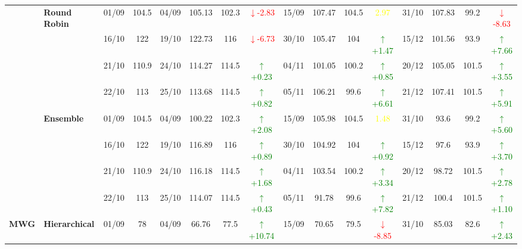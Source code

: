 \documentclass{ieeeaccess}
\begin{document}
{\begin{longtable}{llcc|cccc|cccc|cccc}
& \textbf{Round Robin}
& 01/09 & 104.5 & 04/09 & 105.13 & 102.3 & \textcolor{red}{\(\downarrow\)-2.83} & 15/09 & 107.47 & 104.5 & \textcolor{yellow}{2.97} & 31/10 & 107.83 & 99.2 & \textcolor{red}{\(\downarrow\)-8.63} \\

&
& 16/10 & 122 & 19/10 & 122.73 & 116 & \textcolor{red}{\(\downarrow\)-6.73} & 30/10 & 105.47 & 104 & \textcolor{green}{\(\uparrow\)+1.47} & 15/12 & 101.56 & 93.9 & \textcolor{green}{\(\uparrow\)+7.66} \\

&
& 21/10 & 110.9 & 24/10 & 114.27 & 114.5 & \textcolor{green}{\(\uparrow\)+0.23} & 04/11 & 101.05 & 100.2 & \textcolor{green}{\(\uparrow\)+0.85} & 20/12 & 105.05 & 101.5 & \textcolor{green}{\(\uparrow\)+3.55} \\

&
& 22/10 & 113 & 25/10 & 113.68 & 114.5 & \textcolor{green}{\(\uparrow\)+0.82} & 05/11 & 106.21 & 99.6 & \textcolor{green}{\(\uparrow\)+6.61} & 21/12 & 107.41 & 101.5 & \textcolor{green}{\(\uparrow\)+5.91} \\
\cmidrule(lr){2-16}


& \textbf{Ensemble}
& 01/09 & 104.5 & 04/09 & 100.22 & 102.3 & \textcolor{green}{\(\uparrow\)+2.08} & 15/09 & 105.98 & 104.5 & \textcolor{yellow}{1.48} & 31/10 & 93.6 & 99.2 & \textcolor{green}{\(\uparrow\)+5.60} \\

&
& 16/10 & 122 & 19/10 & 116.89 & 116 & \textcolor{green}{\(\uparrow\)+0.89} & 30/10 & 104.92 & 104 & \textcolor{green}{\(\uparrow\)+0.92} & 15/12 & 97.6 & 93.9 & \textcolor{green}{\(\uparrow\)+3.70} \\

&
& 21/10 & 110.9 & 24/10 & 116.18 & 114.5 & \textcolor{green}{\(\uparrow\)+1.68} & 04/11 & 103.54 & 100.2 & \textcolor{green}{\(\uparrow\)+3.34} & 20/12 & 98.72 & 101.5 & \textcolor{green}{\(\uparrow\)+2.78} \\

&
& 22/10 & 113 & 25/10 & 114.07 & 114.5 & \textcolor{green}{\(\uparrow\)+0.43} & 05/11 & 91.78 & 99.6 & \textcolor{green}{\(\uparrow\)+7.82} & 21/12 & 100.4 & 101.5 & \textcolor{green}{\(\uparrow\)+1.10} \\
\midrule




\multirow{12}{*}{\textbf{MWG}} 
& \textbf{Hierarchical}
& 01/09 & 78 & 04/09 & 66.76 & 77.5 & \textcolor{green}{\(\uparrow\)+10.74} & 15/09 & 70.65 & 79.5 & \textcolor{red}{\(\downarrow\)-8.85} & 31/10 & 85.03 & 82.6 & \textcolor{green}{\(\uparrow\)+2.43} \\


\end{longtable}}
\end{document}

